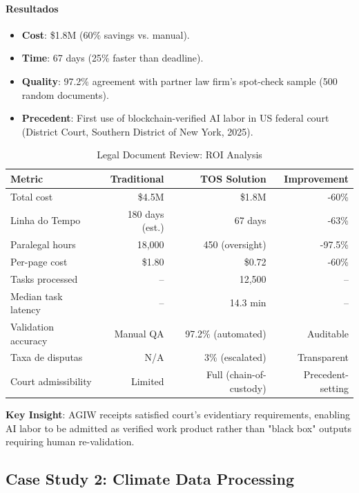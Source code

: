 \documentclass[11pt]{article}
\begin{document}
\begin{itemize}[noitemsep]
\begin{itemize}[noitemsep]
\begin{itemize}[noitemsep]
\paragraph{Resultados}
\begin{itemize}[noitemsep]
  \item \textbf{Cost}: \$1.8M (60\% savings vs. manual).
  \item \textbf{Time}: 67 days (25\% faster than deadline).
  \item \textbf{Quality}: 97.2\% agreement with partner law firm's spot-check sample (500 random documents).
  \item \textbf{Precedent}: First use of blockchain-verified AI labor in US federal court (District Court, Southern District of New York, 2025).
\end{itemize}

\begin{table}[H]
\centering
\caption{Legal Document Review: ROI Analysis}
\label{tab:legal-roi}
\begin{tabular}{@{}lrrr@{}}
\toprule
\textbf{Metric} & \textbf{Traditional} & \textbf{TOS Solution} & \textbf{Improvement} \\ \midrule
Total cost & \$4.5M & \$1.8M & -60\% \\
Linha do Tempo & 180 days (est.) & 67 days & -63\% \\
Paralegal hours & 18,000 & 450 (oversight) & -97.5\% \\
Per-page cost & \$1.80 & \$0.72 & -60\% \\
Tasks processed & -- & 12,500 & -- \\
Median task latency & -- & 14.3 min & -- \\
Validation accuracy & Manual QA & 97.2\% (automated) & Auditable \\
Taxa de disputas & N/A & 3\% (escalated) & Transparent \\
Court admissibility & Limited & Full (chain-of-custody) & Precedent-setting \\
\bottomrule
\end{tabular}
\end{table}

\textbf{Key Insight}: AGIW receipts satisfied court's evidentiary requirements, enabling AI labor to be admitted as verified work product rather than "black box" outputs requiring human re-validation.

\subsection{Case Study 2: Climate Data Processing}


\end{itemize}
\end{itemize}
\end{itemize}
\end{document}

